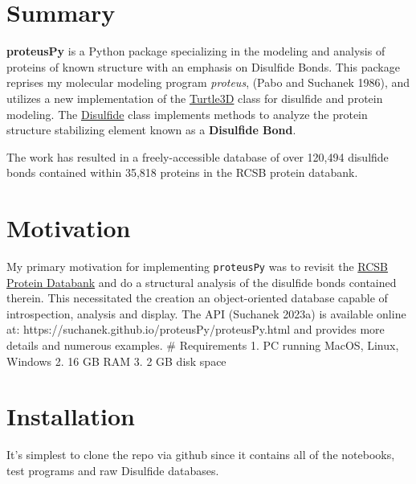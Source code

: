 \hypertarget{summary}{%
\section{Summary}\label{summary}}

\textbf{proteusPy} is a Python package specializing in the modeling and
analysis of proteins of known structure with an emphasis on Disulfide
Bonds. This package reprises my molecular modeling program
\emph{proteus}, (Pabo and Suchanek 1986), and utilizes a new
implementation of the
\href{https://suchanek.github.io/proteusPy/proteusPy/turtle3D.html}{Turtle3D}
class for disulfide and protein modeling. The
\href{https://suchanek.github.io/proteusPy/proteusPy/Disulfide.html}{Disulfide}
class implements methods to analyze the protein structure stabilizing
element known as a \textbf{Disulfide Bond}.

The work has resulted in a freely-accessible database of over 120,494
disulfide bonds contained within 35,818 proteins in the RCSB protein
databank.

\hypertarget{motivation}{%
\section{Motivation}\label{motivation}}

My primary motivation for implementing \texttt{proteusPy} was to revisit
the \href{https://www.rcsb.org}{RCSB Protein Databank} and do a
structural analysis of the disulfide bonds contained therein. This
necessitated the creation an object-oriented database capable of
introspection, analysis and display. The API (Suchanek 2023a) is
available online at: https://suchanek.github.io/proteusPy/proteusPy.html
and provides more details and numerous examples. \# Requirements 1. PC
running MacOS, Linux, Windows 2. 16 GB RAM 3. 2 GB disk space

\hypertarget{installation}{%
\section{Installation}\label{installation}}

It's simplest to clone the repo via github since it contains all of the
notebooks, test programs and raw Disulfide databases.

